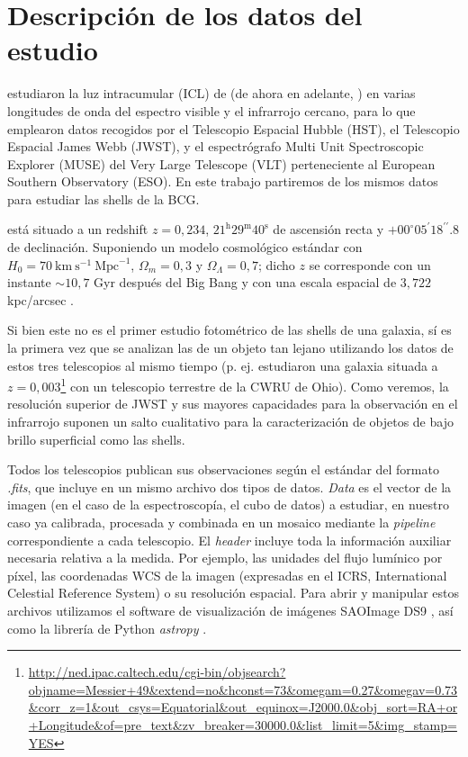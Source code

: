 \section{Descripción de los datos del estudio}
\label{sec:datos}
\citet{jimenez-tejaFirstJointMUSE2024} estudiaron la luz intracumular (ICL) de \cluster{} (de ahora en adelante, \clust{}) en varias longitudes de onda del espectro visible y el infrarrojo cercano, para lo que emplearon datos recogidos por el Telescopio Espacial Hubble (HST), el Telescopio Espacial James Webb (JWST), y el espectrógrafo Multi Unit Spectroscopic Explorer (MUSE) del Very Large Telescope (VLT) perteneciente al European Southern Observatory (ESO). En este trabajo partiremos de los mismos datos para estudiar las shells de la BCG. \par

\clust{} está situado a un redshift \(z=0,234\), \(21^{\text{h}}29^{\text{m}}40^{\text{s}}\) de ascensión recta y \(+00^{\circ} 05^{\prime}18^{\prime\prime}.8\) de declinación. Suponiendo un modelo cosmológico estándar con \(H_0 = 70 \: \text{km} \: \text{s}^{-1} \: \text{Mpc}^{-1}\), \(\Omega_m = 0,3\) y \(\Omega_\Lambda = 0,7\); dicho \(z\) se corresponde con un instante \(\sim 10,7\) Gyr después del Big Bang y con una escala espacial de \(3,722\) kpc/arcsec \citep{wrightCosmologyCalculatorWorld2006}.\par

Si bien este no es el primer estudio fotométrico de las shells de una galaxia, sí es la primera vez que se analizan las de un objeto tan lejano utilizando los datos de estos tres telescopios al mismo tiempo (p. ej. \citet{mihosStelLARPOPULATIONSOUTER2013} estudiaron una galaxia situada a \(z = 0,003\)\footnote{\url{http://ned.ipac.caltech.edu/cgi-bin/objsearch?objname=Messier+49&extend=no&hconst=73&omegam=0.27&omegav=0.73&corr_z=1&out_csys=Equatorial&out_equinox=J2000.0&obj_sort=RA+or+Longitude&of=pre_text&zv_breaker=30000.0&list_limit=5&img_stamp=YES}} con un telescopio terrestre de la CWRU de Ohio). Como veremos, la resolución superior de JWST y sus mayores capacidades para la observación en el infrarrojo suponen un salto cualitativo para la caracterización de objetos de bajo brillo superficial como las shells. \par

Todos los telescopios publican sus observaciones según el estándar del formato \textit{.fits}, que incluye en un mismo archivo dos tipos de datos. \textit{Data} es el vector de la imagen (en el caso de la espectroscopía, el cubo de datos) a estudiar, en nuestro caso ya calibrada, procesada y combinada en un mosaico mediante la \textit{pipeline} correspondiente a cada telescopio. El \textit{header} incluye toda la información auxiliar necesaria relativa a la medida. Por ejemplo, las unidades del flujo lumínico por píxel, las coordenadas WCS de la imagen (expresadas en el ICRS, International Celestial Reference System) o su resolución espacial. Para abrir y manipular estos archivos utilizamos el software de visualización de imágenes SAOImage DS9 \citep{smithsonianastrophysicalobservatorySAOImageDS9Utility2000,joyeNewFeaturesSAOImage2003}, así como la librería de Python \textit{astropy} \citep{astropycollaborationAstropyCommunityPython2013}.
